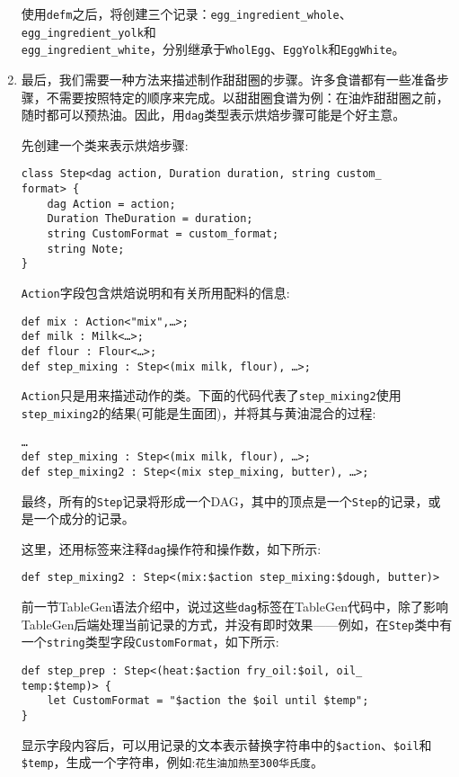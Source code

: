 \begin{enumerate}
使用\texttt{defm}之后，将创建三个记录：\texttt{egg\_ingredient\_whole}、\texttt{egg\_ingredient\_yolk}和\\\texttt{egg\_ingredient\_white}，分别继承于\texttt{WholEgg}、\texttt{EggYolk}和\texttt{EggWhite}。

\item 最后，我们需要一种方法来描述制作甜甜圈的步骤。许多食谱都有一些准备步骤，不需要按照特定的顺序来完成。以甜甜圈食谱为例：在油炸甜甜圈之前，随时都可以预热油。因此，用\texttt{dag}类型表示烘焙步骤可能是个好主意。

先创建一个类来表示烘焙步骤:

\begin{lstlisting}[style=styleCXX]
class Step<dag action, Duration duration, string custom_
format> {
	dag Action = action;
	Duration TheDuration = duration;
	string CustomFormat = custom_format;
	string Note;
}
\end{lstlisting}

\texttt{Action}字段包含烘焙说明和有关所用配料的信息:

\begin{lstlisting}[style=styleCXX]
def mix : Action<"mix",…>;
def milk : Milk<…>;
def flour : Flour<…>;
def step_mixing : Step<(mix milk, flour), …>;
\end{lstlisting}

\texttt{Action}只是用来描述动作的类。下面的代码代表了\texttt{step\_mixing2}使用\texttt{step\_mixing2}的结果(可能是生面团)，并将其与黄油混合的过程:

\begin{lstlisting}[style=styleCXX]
…
def step_mixing : Step<(mix milk, flour), …>;
def step_mixing2 : Step<(mix step_mixing, butter), …>;
\end{lstlisting}

最终，所有的\texttt{Step}记录将形成一个DAG，其中的顶点是一个\texttt{Step}的记录，或是一个成分的记录。

这里，还用标签来注释\texttt{dag}操作符和操作数，如下所示:

\begin{lstlisting}[style=styleCXX]
def step_mixing2 : Step<(mix:$action step_mixing:$dough, butter)>
\end{lstlisting}

前一节TableGen语法介绍中，说过这些\texttt{dag}标签在TableGen代码中，除了影响TableGen后端处理当前记录的方式，并没有即时效果——例如，在\texttt{Step}类中有一个\texttt{string}类型字段\texttt{CustomFormat}，如下所示:

\begin{lstlisting}[style=styleCXX]
def step_prep : Step<(heat:$action fry_oil:$oil, oil_
temp:$temp)> {
	let CustomFormat = "$action the $oil until $temp";
}
\end{lstlisting}

显示字段内容后，可以用记录的文本表示替换字符串中的\texttt{\$action}、\texttt{\$oil}和\texttt{\$temp}，生成一个字符串，例如:\texttt{花生油加热至300华氏度}。

\end{enumerate}

